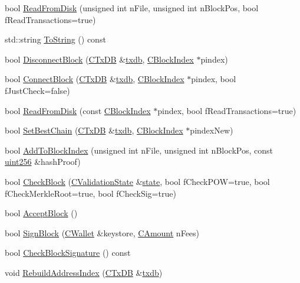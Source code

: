 \begin{DoxyCompactItemize}
\item 
bool \hyperlink{class_c_block_a77a1b1e9902e1e557d762f5a5f325cd8}{Read\+From\+Disk} (unsigned int n\+File, unsigned int n\+Block\+Pos, bool f\+Read\+Transactions=true)
\item 
std\+::string \hyperlink{class_c_block_a85d1cca7cd03ad1893767ae8305bd3b5}{To\+String} () const 
\item 
bool \hyperlink{class_c_block_a9532c041d24701a338ea5c91008b72aa}{Disconnect\+Block} (\hyperlink{class_c_tx_d_b}{C\+Tx\+D\+B} \&\hyperlink{txdb-leveldb_8cpp_a72eff8ae1d84de13daf97a61b8c02bc6}{txdb}, \hyperlink{class_c_block_index}{C\+Block\+Index} $\ast$pindex)
\item 
bool \hyperlink{class_c_block_a1ae149d97c7b7eadf48f5cea934b6217}{Connect\+Block} (\hyperlink{class_c_tx_d_b}{C\+Tx\+D\+B} \&\hyperlink{txdb-leveldb_8cpp_a72eff8ae1d84de13daf97a61b8c02bc6}{txdb}, \hyperlink{class_c_block_index}{C\+Block\+Index} $\ast$pindex, bool f\+Just\+Check=false)
\item 
bool \hyperlink{class_c_block_ad31bb55c819816d722ebc0980d85cfc7}{Read\+From\+Disk} (const \hyperlink{class_c_block_index}{C\+Block\+Index} $\ast$pindex, bool f\+Read\+Transactions=true)
\item 
bool \hyperlink{class_c_block_a6e308b2d75d1cfc4a75eda36feb60ca1}{Set\+Best\+Chain} (\hyperlink{class_c_tx_d_b}{C\+Tx\+D\+B} \&\hyperlink{txdb-leveldb_8cpp_a72eff8ae1d84de13daf97a61b8c02bc6}{txdb}, \hyperlink{class_c_block_index}{C\+Block\+Index} $\ast$pindex\+New)
\item 
bool \hyperlink{class_c_block_afab527f890c5575db3b1a2b17f47bf5a}{Add\+To\+Block\+Index} (unsigned int n\+File, unsigned int n\+Block\+Pos, const \hyperlink{classuint256}{uint256} \&hash\+Proof)
\item 
bool \hyperlink{class_c_block_aa735790178f95defd59f984dd51bc0f2}{Check\+Block} (\hyperlink{class_c_validation_state}{C\+Validation\+State} \&\hyperlink{version__set_8cc_a6aad002d0db5e5e85dc31927a5a6f503}{state}, bool f\+Check\+P\+O\+W=true, bool f\+Check\+Merkle\+Root=true, bool f\+Check\+Sig=true)
\item 
bool \hyperlink{class_c_block_a3f990a713116bd15c1f221c88b012ccf}{Accept\+Block} ()
\item 
bool \hyperlink{class_c_block_a5a6b04461fc7ab5b21f00d6c403e35dd}{Sign\+Block} (\hyperlink{class_c_wallet}{C\+Wallet} \&keystore, \hyperlink{amount_8h_a4eaf3a5239714d8c45b851527f7cb564}{C\+Amount} n\+Fees)
\item 
bool \hyperlink{class_c_block_a7e0103e7a0117173cb9c975702e06392}{Check\+Block\+Signature} () const 
\item 
void \hyperlink{class_c_block_aea2c77ad84cd7909720f75a0c3f7ddc2}{Rebuild\+Address\+Index} (\hyperlink{class_c_tx_d_b}{C\+Tx\+D\+B} \&\hyperlink{txdb-leveldb_8cpp_a72eff8ae1d84de13daf97a61b8c02bc6}{txdb})
\end{DoxyCompactItemize}
